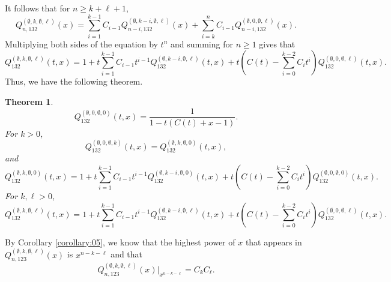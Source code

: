 \documentclass[
final,nomarks
]{dmtcs-episciences}
\newtheorem{theorem}{Theorem}
\newcommand{\Qmm}[1]{Q_{132}^{(#1)}(t,x)}
\newcommand{\Qmmn}[2]{Q_{#2,132}^{(#1)}(x)}
\newcommand{\Qmn}[2]{Q_{#2,123}^{(#1)}(x)}
\begin{document}
It follows that for \begin{math}n \geq k + \ell+1\end{math}, 
\begin{equation}
\Qmmn{\emptyset,k,\emptyset,\ell}{n}=\sum_{i=1}^{k-1}C_{i-1}\Qmmn{\emptyset,k-i,\emptyset,\ell}{n-i}+\sum_{i=k}^{n}C_{i-1}\Qmmn{\emptyset,0,\emptyset,\ell}{n-i}.
\end{equation}
Multiplying both sides of the equation by \begin{math}t^n\end{math} and summing for \begin{math}n\geq 1\end{math} gives that
\begin{equation}
\Qmm{\emptyset,k,\emptyset,\ell}=1+t\sum_{i=1}^{k-1}C_{i-1}t^{i-1}\Qmm{\emptyset,k-i,\emptyset,\ell}+t(C(t)-\sum_{i=0}^{k-2}C_i t^i)\Qmm{\emptyset,0,\emptyset,\ell}.
\end{equation}
Thus, we have the following theorem.
\begin{theorem}\label{theorem:9}
	\begin{equation}
	\Qmm{\emptyset,0,\emptyset,0}=\frac{1}{1-t(C(t)+x-1)}.
	\end{equation}
	For \begin{math}k >0\end{math},
	\begin{equation}
	\Qmm{\emptyset,0,\emptyset,k}=\Qmm{\emptyset,k,\emptyset,0},
	\end{equation}
	and
	\begin{equation}
	\Qmm{\emptyset,k,\emptyset,0}=1+t\sum_{i=1}^{k-1}C_{i-1}t^{i-1}\Qmm{\emptyset,k-i,\emptyset,0}+t(C(t)-\sum_{i=0}^{k-2}C_i t^i)\Qmm{\emptyset,0,\emptyset,0}.
	\end{equation}
	For \begin{math}k, \ell > 0\end{math}, 
	\begin{equation}
	\Qmm{\emptyset,k,\emptyset,\ell}=1+t\sum_{i=1}^{k-1}C_{i-1}t^{i-1}\Qmm{\emptyset,k-i,\emptyset,\ell}+t(C(t)-\sum_{i=0}^{k-2}C_i t^i)\Qmm{\emptyset,0,\emptyset,\ell}.
	\end{equation}
\end{theorem}

By Corollary \ref{corollary:05}, we know that 
the highest power of \begin{math}x\end{math} that appears in \begin{math}\Qmn{\emptyset,k,\emptyset,\ell}{n}\end{math} is \begin{math}x^{n-k-\ell}\end{math} and 
that 
\begin{equation}
\Qmn{\emptyset,k,\emptyset,\ell}{n}\big\vert_{x^{n-k-\ell}}=C_k C_\ell.
\end{equation}
\end{document}
